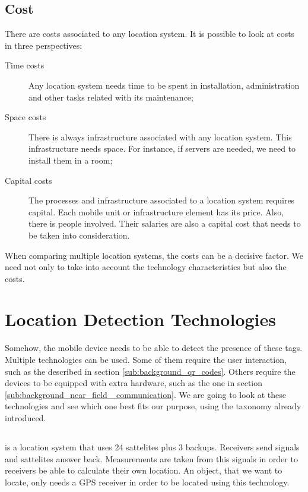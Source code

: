 \subsection{Cost}
\label{sub:background_cost}
There are costs associated to any location system.
It is possible to look at costs in three perspectives:
\begin{description}
  \item[Time costs] Any location system needs time to be spent in installation, administration and other tasks related with its maintenance;
  \item[Space costs] There is always infrastructure associated with any location system. This infrastructure needs space. For instance, if servers are needed, we need to install them in a room;
  \item[Capital costs] The processes and infrastructure associated to a location system requires capital.
  Each mobile unit or infrastructure element has its price. Also, there is people involved. Their salaries are also a capital cost that needs to be taken into consideration.
\end{description}

When comparing multiple location systems, the costs can be a decisive factor. We need not only to take into account the technology characteristics but also the costs.

\section{Location Detection Technologies}
\label{sec:background_technologies}
Somehow, the mobile device needs to be able to detect the presence of these tags.
Multiple technologies can be used.
Some of them require the user interaction, such as the described in section \ref{sub:background_qr_codes}.
Others require the devices to be equipped with extra hardware, such as the one in section \ref{sub:background_near_field _communication}.
We are going to look at these technologies and see which one best fits our purpose, using the taxonomy already introduced.

\subsection{}
\label{sub:background_gps}
\cite{gps} is a location system that uses 24 sattelites plus 3 backups.
Receivers send signals and sattelites answer back. Measurements are taken from this signals in order to receivers be able to calculate their own location.
An object, that we want to locate, only needs a \gls{GPS} receiver in order to be located using this technology.


